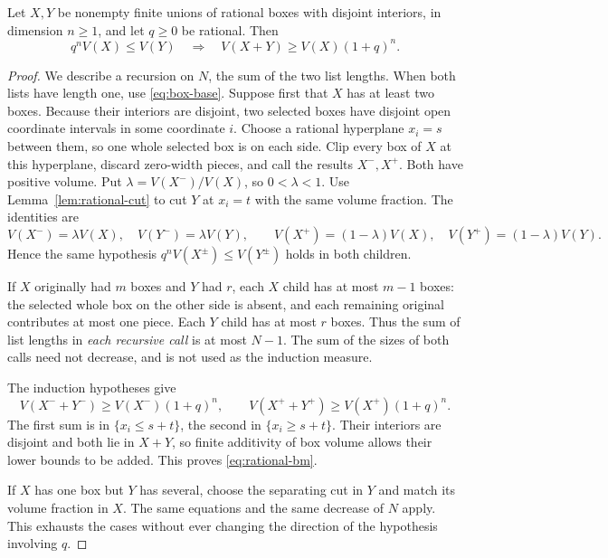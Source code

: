 \begin{theorem}
\label{thm:rational-bm}
Let \(X,Y\) be nonempty finite unions of rational boxes with disjoint
interiors, in dimension \(n\geq1\), and let \(q\geq0\) be rational.
Then
\begin{equation}\label{eq:rational-bm}
 q^n V(X)\leq V(Y)
 \quad\Longrightarrow\quad
 V(X+Y)\geq V(X)(1+q)^n.
\end{equation}
\end{theorem}
\begin{proof}
We describe a recursion on \(N\), the sum of the two list lengths.
When both lists have length one, use \eqref{eq:box-base}.
Suppose first that \(X\) has at least two boxes. Because their interiors
are disjoint, two selected boxes have disjoint open coordinate intervals
in some coordinate \(i\). Choose a rational hyperplane \(x_i=s\)
between them, so one whole selected box is on each side. Clip every box
of \(X\) at this hyperplane, discard zero-width pieces, and call the
results \(X^-,X^+\). Both have positive volume. Put
\(\lambda=V(X^-)/V(X)\), so \(0<\lambda<1\).
Use Lemma~\ref{lem:rational-cut} to cut \(Y\) at \(x_i=t\) with
the same volume fraction. The identities are
\[
 V(X^-)=\lambda V(X),\quad V(Y^-)=\lambda V(Y),\qquad
 V(X^+)=(1-\lambda)V(X),\quad V(Y^+)=(1-\lambda)V(Y).
\]
Hence the same hypothesis \(q^nV(X^\pm)\leq V(Y^\pm)\) holds
in both children.

If \(X\) originally had \(m\) boxes and \(Y\) had \(r\), each
\(X\) child has at most \(m-1\) boxes: the selected whole box on
the other side is absent, and each remaining original contributes at
most one piece. Each \(Y\) child has at most \(r\) boxes.
Thus the sum of list lengths in \emph{each recursive call} is at most
\(N-1\). The sum of the sizes of both calls need not decrease, and is
not used as the induction measure.

The induction hypotheses give
\[
 V(X^-+Y^-)\geq V(X^-)(1+q)^n,
 \qquad V(X^++Y^+)\geq V(X^+)(1+q)^n.
\]
The first sum is in \(\{x_i\leq s+t\}\), the second in
\(\{x_i\geq s+t\}\). Their interiors are disjoint and both lie in
\(X+Y\), so finite additivity of box volume allows their lower bounds
to be added. This proves \eqref{eq:rational-bm}.

If \(X\) has one box but \(Y\) has several, choose the separating cut
in \(Y\) and match its volume fraction in \(X\). The same equations
and the same decrease of \(N\) apply. This exhausts the cases without
ever changing the direction of the hypothesis involving \(q\).
\end{proof}

